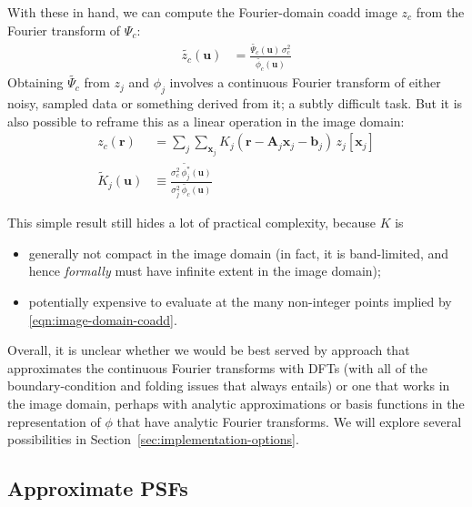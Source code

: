 \documentclass[DM,authoryear,toc]{lsstdoc}
\begin{document}
With these in hand, we can compute the Fourier-domain coadd image $z_c$ from the Fourier transform of $\Psi_c$:
\begin{align}
    \widetilde{z_c}(\symbf{u})
        &= \frac{\widetilde{\Psi_c}(\symbf{u}) \, \sigma_c^2}{\widetilde{\phi_c}(\symbf{u})}
\end{align}
Obtaining $\widetilde{\Psi_c}$ from $z_j$ and $\phi_j$ involves a continuous Fourier transform of either noisy, sampled data or something derived from it; a subtly difficult task.
But it is also possible to reframe this as a linear operation in the image domain:
\begin{align}
    z_c(\symbf{r}) &= \sum_j \sum_{\symbf{x}_j} K_j\!\left(\symbf{r} - \symbf{A}_j\symbf{x}_j - \symbf{b}_j\right)
        \, z_j[\symbf{x}_j] \label{eqn:image-domain-coadd} \\
    \widetilde{K}_j(\symbf{u}) &\equiv
        \frac{
            \sigma_c^2 \, \widetilde{\phi_j^\ast}(\symbf{u})
        }{
            \sigma_j^2 \, \widetilde{\phi_c}(\symbf{u})
        }
\end{align}

This simple result still hides a lot of practical complexity, because $K$ is
\begin{itemize}
    \item generally not compact in the image domain (in fact, it is band-limited, and hence \emph{formally} must have infinite extent in the image domain);
    \item potentially expensive to evaluate at the many non-integer points implied by \ref{eqn:image-domain-coadd}.
\end{itemize}

Overall, it is unclear whether we would be best served by approach that approximates the continuous Fourier transforms with DFTs (with all of the boundary-condition and folding issues that always entails) or one that works in the image domain, perhaps with analytic approximations or basis functions in the representation of $\phi$ that have analytic Fourier transforms.
We will explore several possibilities in Section~\ref{sec:implementation-options}.

\subsection{Approximate PSFs}
\end{document}
